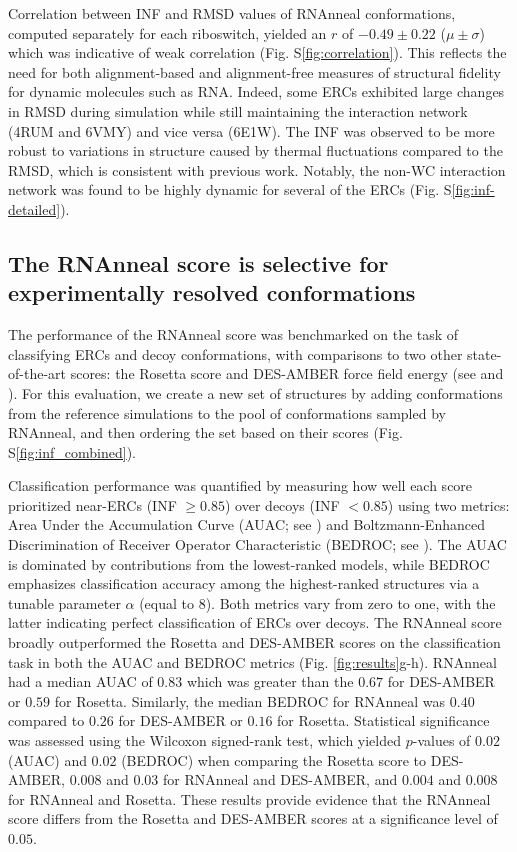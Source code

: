 \documentclass[%
aip,
 amsmath,amssymb,
reprint,%
twocolumn,
]{revtex4-1}
\begin{document}
{Correlation between INF and RMSD values of RNAnneal conformations, computed separately for each riboswitch, yielded an $r$ of $-0.49\pm0.22$ ($\mu\pm\sigma$) which was indicative of weak correlation (Fig. S\ref{fig:correlation}). This reflects the need for both alignment-based and alignment-free measures of structural fidelity for dynamic molecules such as RNA. Indeed, some ERCs exhibited large changes in RMSD during simulation while still maintaining the interaction network (4RUM\cite{Ramesh2014} and 6VMY) and vice versa (6E1W\cite{Numata2019}). The INF was observed to be more robust to variations in structure caused by thermal fluctuations compared to the RMSD, which is consistent with previous work\cite{parisien2009new}. Notably, the non-WC interaction network was found to be highly dynamic for several of the ERCs (Fig. S\ref{fig:inf-detailed}). 


\subsection*{The RNAnneal score is selective for experimentally resolved conformations}

The performance of the RNAnneal score was benchmarked on the task of classifying ERCs and decoy conformations, with comparisons to two other state-of-the-art scores: the Rosetta score and DES-AMBER force field energy (see  and ). For this evaluation, we create a new set of structures by adding conformations from the reference simulations to the pool of conformations sampled by RNAnneal, and then ordering the set based on their scores (Fig. S\ref{fig:inf_combined}). 

Classification performance was quantified by measuring how well each score prioritized near-ERCs (INF $\geq 0.85$) over decoys (INF $< 0.85$) using two metrics: Area Under the Accumulation Curve (AUAC; see ) and Boltzmann-Enhanced Discrimination of Receiver Operator Characteristic (BEDROC; see ).\cite{truchon2007evaluating} The AUAC is dominated by contributions from the lowest-ranked models, while BEDROC emphasizes classification accuracy among the highest-ranked structures via a tunable parameter $\alpha$ (equal to 8). Both metrics vary from zero to one, with the latter indicating perfect classification of ERCs over decoys. The RNAnneal score broadly outperformed the Rosetta and DES-AMBER scores on the classification task in both the AUAC and BEDROC metrics (Fig. \ref{fig:results}g-h). RNAnneal had a median AUAC of $0.83$ which was greater than the $0.67$ for DES-AMBER or $0.59$ for Rosetta. Similarly, the median BEDROC for RNAnneal was $0.40$ compared to $0.26$ for DES-AMBER or $0.16$ for Rosetta. Statistical significance was assessed using the Wilcoxon signed-rank test, which yielded $p$-values of $0.02$ (AUAC) and $0.02$ (BEDROC) when comparing the Rosetta score to DES-AMBER, $0.008$ and $0.03$ for RNAnneal and DES-AMBER, and $0.004$ and $0.008$ for RNAnneal and Rosetta. These results provide evidence that the RNAnneal score differs from the Rosetta and DES-AMBER scores at a significance level of $0.05$.

}
\end{document}
